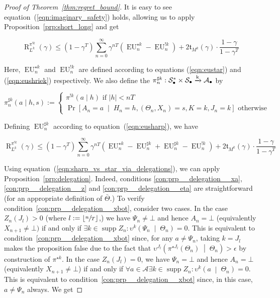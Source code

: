 \documentclass[anon,12pt]{colt2018} %
\newcommand{\Comment}[1]{}
\DeclareMathOperator{\Supp}{supp}
\newcommand{\AP}[1]{\left(#1\right)}
\newcommand{\APM}[2]{\left(#1\;\middle\vert\;#2\right)}
\newcommand{\ABM}[2]{\left[#1\;\middle\vert\;#2\right]}
\newcommand{\CP}[3]{\underset{#1}{\operatorname{Pr}}\ABM{#2}{#3}}
\newcommand{\Reals}{\mathbb{R}}
\newcommand{\Abs}[1]{\left\vert #1 \right\vert}
\newcommand{\Floor}[1]{\left\lfloor #1 \right\rfloor}
\newcommand{\K}{\xrightarrow{\textnormal{k}}}
\newcommand{\A}{\mathcal{A}}
\newcommand{\St}{\mathcal{S}}
\newcommand{\EU}{\operatorname{EU}}
\newcommand{\Rg}{\operatorname{R}}
\newcommand{\Tn}{\mathfrak{t}}
\newcommand{\Ad}{\upsilon}
\newcommand{\X}{\bullet}
\newcommand{\PoS}{:\St_\X^* \times \St_\X \K \A_\X}
\newcommand{\IP}{\pi^{!k}}
\begin{document}
\begin{proof}[Proof of Theorem~\ref{thm:regret_bound}]
\Comment{...we define $\alpha_{\Ad\pi}: \St_\X^* \K \St^*$ by

$$\alpha_{\sigma\pi} (g \mid h) := [[h = \underline{g}]]C_h\prod_{n = 0}^{\Abs{h}-1} \sum_{a \in \A}\left([[g_n \in \bot a?]] \pi\left(\bot \mid g_{:n}\right)\sigma\left(a \mid h_{:n}\right)+[[g_n \in a\bot?]]\pi\left(a \mid g_{:n}\right)\right)$$

Here, $C_h \in \Reals$ is a constant defined s.t. the probabilities sum to 1. We define the $?$-policy $\left[\sigma\right]\underline{\pi}$ by

$$\left[\sigma\right]\underline{\pi}(a \mid h):=\Pr_{g \sim \alpha_{\sigma\pi}(h)}\left[\pi\left(g\right)=a \lor \left(\pi\left(g\right)=\bot \land \sigma(h)=a\right)\right]$$}

It is easy to see equation~(\ref{eqn:imaginary_safety}) holds, allowing us to apply Proposition~\ref{prp:short_long} and get

\[\Rg_{L^k}^{\IP}(\gamma) \leq \AP{1-\gamma^T}\sum_{n=0}^\infty \gamma^{nT}\AP{\EU^{\star k}_n-\EU^{!k}_n}+2\Tn_{M^k}(\gamma)\cdot\frac{1-\gamma}{1-\gamma^T}\]

Here, $\EU^{\star k}_n$ and $\EU^{!k}_n$ are defined according to equations (\ref{eqn:eustar}) and (\ref{eqn:eushriek}) respectively. We also define the $\pi^{\sharp k}_n\PoS$ by

$$\pi^{\sharp k}_n(a \mid h,s):=\begin{cases} \pi^{!k}(a \mid h) \text{ if } \Abs{h} < nT \\ \CP{}{A_n=a}{H_n=h,\AP{\Theta_n,X_n}=s,K=k,J_n=k} \text{ otherwise} \end{cases}$$

Defining $\EU^{\sharp k}_n$ according to equation~(\ref{eqn:eusharp}), we have

\[\Rg_{L^k}^{\IP}(\gamma) \leq \AP{1-\gamma^T}\sum_{n=0}^\infty \gamma^{nT}\AP{\EU^{\star k}_n-\EU^{\sharp k}_n+\EU^{\sharp k}_n-\EU^{!k}_n}+2\Tn_{M^k}(\gamma)\cdot\frac{1-\gamma}{1-\gamma^T}\]

Using equation~(\ref{eqn:sharp_vs_star_via_delegations}), we can apply Proposition~\ref{prp:delegation}. Indeed, conditions \ref{con:prp__delegation__xa}, \ref{con:prp__delegation__z} and \ref{con:prp__delegation__eta} are straightforward (for an appropriate definition of $\bar{\Theta}$.) To verify condition~\ref{con:prp__delegation__xbot}, consider two cases. In the case $Z_n\AP{J_l} > 0$ (where $l:=\Floor{\sfrac{n}{T}}$,) we have $\Psi_n\ne\bot$ and hence $A_n=\bot$ (equivalently $X_{n+1}\ne\bot)$ if and only if $\exists k \in \Supp{Z_n}: \Ad^k\APM{\Psi_n}{\Theta_n}=0$. This is equivalent to condition~\ref{con:prp__delegation__xbot} since, for any $a\ne\Psi_n$, taking $k=J_l$ makes the proposition false due to the fact that $\Ad^{J_l}\APM{\pi^{\star J_l}\AP{\Theta_n}}{\Theta_n} > \epsilon$ by construction of $\pi^{\star k}$. In the case $Z_n\AP{J_l} = 0$, we have $\Psi_n=\bot$ and hence $A_n=\bot$ (equivalently $X_{n+1}\ne\bot$) if and only if $\forall a\in\A\exists k \in \Supp{Z_n}:\Ad^k\APM{a}{\Theta_n}=0$. This is equivalent to condition~\ref{con:prp__delegation__xbot} since, in this case, $a\ne\Psi_n$ always. We get


\end{proof}
\end{document}
